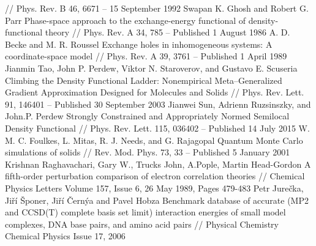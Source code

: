 \begin{thebibliography}{3}
// Phys. Rev. B 46, 6671 – 15 September 1992
Swapan K. Ghosh and Robert G. Parr Phase-space approach to the exchange-energy functional of density-functional theory //
Phys. Rev. A 34, 785 – Published 1 August 1986
A. D. Becke and M. R. Roussel Exchange holes in inhomogeneous systems: A coordinate-space model //
Phys. Rev. A 39, 3761 – Published 1 April 1989
Jianmin Tao, John P. Perdew, Viktor N. Staroverov, and Gustavo E. Scuseria Climbing the Density Functional Ladder: Nonempirical Meta–Generalized Gradient Approximation Designed for Molecules and Solids //
Phys. Rev. Lett. 91, 146401 – Published 30 September 2003
Jianwei Sun, Adrienn Ruzsinszky, and John.P. Perdew Strongly Constrained and Appropriately Normed Semilocal Density Functional //
Phys. Rev. Lett. 115, 036402 – Published 14 July 2015
W. M. C. Foulkes, L. Mitas, R. J. Needs, and G. Rajagopal Quantum Monte Carlo simulations of solids //
Rev. Mod. Phys. 73, 33 – Published 5 January 2001
Krishnan Raghavachari, Gary W., Trucks John, A.Pople, Martin Head-Gordon A fifth-order perturbation comparison of electron correlation theories // Chemical Physics Letters
Volume 157, Issue 6, 26 May 1989, Pages 479-483
Petr Jurečka, Jiří Šponer, Jiří Černýa and Pavel Hobza Benchmark database of accurate (MP2 and CCSD(T) complete basis set limit) interaction energies of small model complexes, DNA base pairs, and amino acid pairs // Physical Chemistry Chemical Physics Issue 17, 2006




\end{thebibliography}
